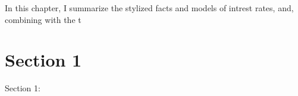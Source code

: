\minitoc

\vspace{0.5cm}

In this chapter, I summarize the stylized facts and models of intrest rates, 
and, combining with the t

\section{Section 1}
Section 1:
